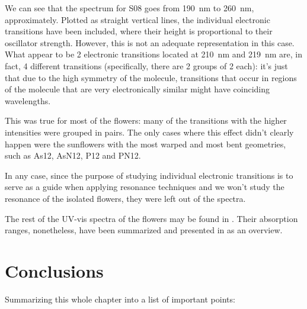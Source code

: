 We can see that the spectrum for S08 goes from \SI{190}{\nano\metre} to \SI{260}{\nano\metre}, approximately.
Plotted as straight vertical lines, the individual electronic transitions have been included, where their height is proportional to their oscillator strength.
However, this is not an adequate representation in this case.
What appear to be 2 electronic transitions located at \SI{210}{\nano\metre} and \SI{219}{\nano\metre} are, in fact, 4 different transitions (specifically, there are 2 groups of 2 each): it's just that due to the high symmetry of the molecule, transitions that occur in regions of the molecule that are very electronically similar might have coinciding wavelengths.

This was true for most of the flowers: many of the transitions with the higher intensities were grouped in pairs.
The only cases where this effect didn't clearly happen were the sunflowers with the most warped and most bent geometries, such as As12, AsN12, P12 and PN12.

In any case, since the purpose of studying individual electronic transitions is to serve as a guide when applying resonance techniques and we won't study the resonance of the isolated flowers, they were left out of the spectra.

The rest of the UV-vis spectra of the flowers may be found in .
Their absorption ranges, nonetheless, have been summarized and presented in  as an overview.

\section{Conclusions}

Summarizing this whole chapter into a list of important points:


